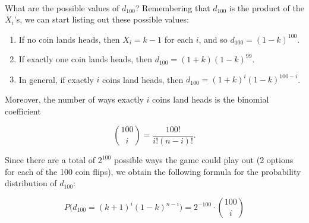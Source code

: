 \documentclass[12pt, oneside]{book}
\theoremstyle{plain}
\theoremstyle{definition}
\begin{document}
\

What are the possible values of $d_{100}$? Remembering that $d_{100}$ is the product of the $X_i$'s, we can start listing out these possible values:

\begin{enumerate}
\item If no coin lands heads, then $X_i=k-1$ for each $i$, and so $d_{100} = (1-k)^{100}$. 
\item If exactly one coin lands heads, then $d_{100} = (1+k)(1-k)^{99}$.
\item In general, if exactly $i$ coins land heads, then $d_{100} = (1+k)^i (1-k)^{100-i}$.
\end{enumerate}

Moreover, the number of ways exactly $i$ coins land heads is the binomial coefficient

\[
\binom{100}{i} = \frac{100!}{i!(n-i)!}.
\]

Since there are a total of $2^{100}$ possible ways the game could play out (2 options for each of the 100 coin flips), we obtain the following formula for the probability distribution of $d_{100}$:

\begin{equation}\label{eqn:dist1}
P \Big (d_{100}=(k+1)^i(1-k)^{n-i} \Big ) = 2^{-100} \cdot \binom{100}{i}
\end{equation}
\end{document}
